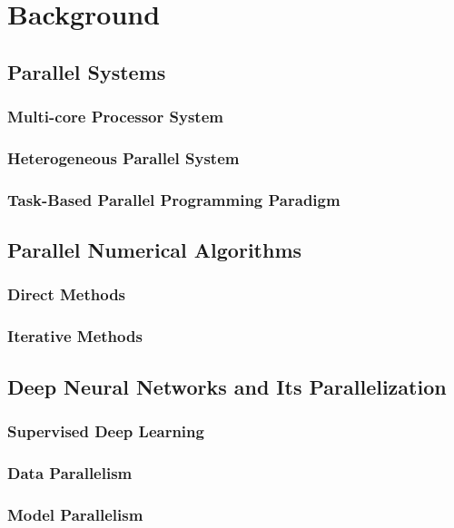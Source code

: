 
\chapter{Background}
\label{chap:background}

\section{Parallel Systems}
\subsection{Multi-core Processor System}
\subsection{Heterogeneous Parallel System}
\subsection{Task-Based Parallel Programming Paradigm}

\section{Parallel Numerical Algorithms}
\subsection{Direct Methods}
\subsection{Iterative Methods}

\section{Deep Neural Networks and Its Parallelization}
\subsection{Supervised Deep Learning}
\subsection{Data Parallelism}
\subsection{Model Parallelism}
